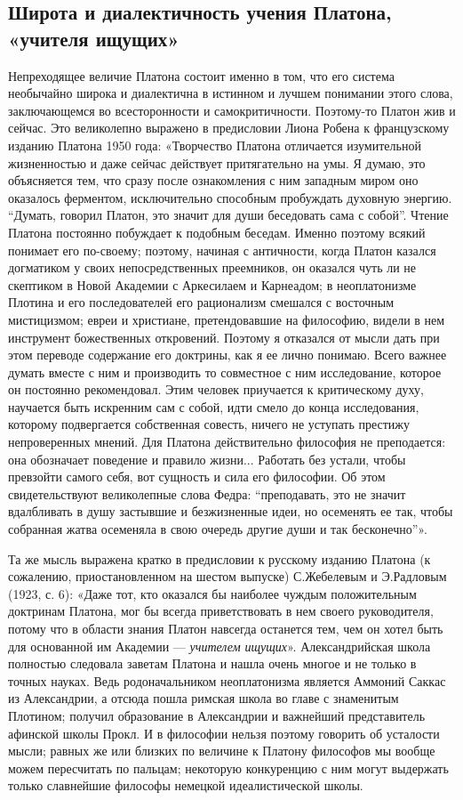 \subsection{Широта и диалектичность учения Платона, «учителя ищущих»}

Непреходящее величие Платона состоит именно в том, что его система
необычайно широка и диалектична в истинном и лучшем понимании этого
слова, заключающемся во всесторонности и самокритичности. Поэтому-то
Платон жив и сейчас. Это великолепно выражено в предисловии Лиона
Робена к французскому изданию Платона 1950 года: «Творчество Платона
отличается изумительной жизненностью и даже сейчас действует
притягательно на умы. Я думаю, это объясняется тем, что сразу после
ознакомления с ним западным миром оно оказалось ферментом,
исключительно способным пробуждать духовную энергию. ``Думать, говорил
Платон, это значит для души беседовать сама с собой''. Чтение Платона
постоянно побуждает к подобным беседам. Именно поэтому всякий понимает
его по-своему; поэтому, начиная с античности, когда Платон казался
догматиком у своих непосредственных преемников, он оказался чуть ли не
скептиком в Новой Академии с Аркесилаем и Карнеадом; в неоплатонизме
Плотина и его последователей его рационализм смешался с восточным
мистицизмом; евреи и христиане, претендовавшие на философию, видели в
нем инструмент божественных откровений. Поэтому я отказался от мысли
дать при этом переводе содержание его доктрины, как я ее лично
понимаю. Всего важнее думать вместе с ним и производить то совместное
с ним исследование, которое он постоянно рекомендовал. Этим человек
приучается к критическому духу, научается быть искренним сам с собой,
идти смело до конца исследования, которому подвергается собственная
совесть, ничего не уступать престижу непроверенных мнений. Для Платона
действительно философия не преподается: она обозначает поведение и
правило жизни... Работать без устали, чтобы превзойти самого себя, вот
сущность и сила его философии. Об этом свидетельствуют великолепные
слова Федра: ``преподавать, это не значит вдалбливать в душу застывшие
и безжизненные идеи, но осеменять ее так, чтобы собранная жатва
осеменяла в свою очередь другие души и так бесконечно''».

Та же мысль выражена кратко в предисловии к русскому изданию Платона
(к сожалению, приостановленном на шестом выпуске) С.Жебелевым и
Э.Радловым (1923, с. 6): «Даже тот, кто оказался бы наиболее чуждым
положительным доктринам Платона, мог бы всегда приветствовать в нем
своего руководителя, потому что в области знания Платон навсегда
останется тем, чем он хотел быть для основанной им Академии ---
\emph{учителем ищущих}». Александрийская школа полностью следовала
заветам Платона и нашла очень многое и не только в точных науках. Ведь
родоначальником неоплатонизма является Аммоний Саккас из Александрии,
а отсюда пошла римская школа во главе с знаменитым Плотином; получил
образование в Александрии и важнейший представитель афинской школы
Прокл. И в философии нельзя поэтому говорить об усталости мысли;
равных же или близких по величине к Платону философов мы вообще можем
пересчитать по пальцам; некоторую конкуренцию с ним могут выдержать
только славнейшие философы немецкой идеалистической школы.

